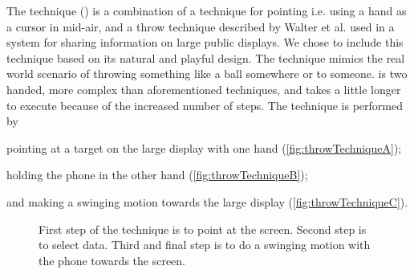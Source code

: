 The \throw technique () is a combination of a technique for pointing \cite{Scheible:2008} i.e. using a hand as a cursor in mid-air, and a throw technique described by Walter et al. \cite{Walter:2014} used in a system for sharing information on large public displays.
We chose to include this technique based on its natural and playful design.
The technique mimics the real world scenario of throwing something like a ball somewhere or to someone.
\throw is two handed, more complex than aforementioned techniques, and takes a little longer to execute because of the increased number of steps.
The \throw technique is performed by 
\begin{enumerate*}[label=\itshape\roman*\upshape)]
	\item{pointing at a target on the large display with one hand (\cref{fig:throwTechniqueA});}
	\item{holding the phone in the other hand (\cref{fig:throwTechniqueB});}
	\item{and making a swinging motion towards the large display (\cref{fig:throwTechniqueC}).}
\end{enumerate*}

\begin{figure}[H]
\caption{\protect{} First step of the \throw technique is to point at the screen. \protect{} Second step is to select data. \protect{} Third and final step is to do a swinging motion with the phone towards the screen.}
\label{fig:throwTechnique}
\end{figure}

